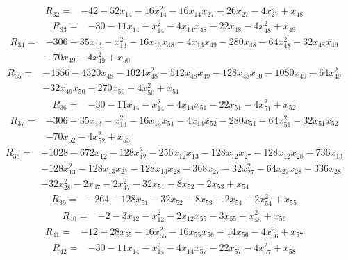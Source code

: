 \[\begin{aligned}R_{32}={}&-42-52x_{14}-16x_{14}^{2}-16x_{14}x_{27}-26x_{27}-4x_{27}^{2}+x_{48}
\end{aligned}\]
\[\begin{aligned}R_{33}={}&-30-11x_{14}-x_{14}^{2}-4x_{14}x_{48}-22x_{48}-4x_{48}^{2}+x_{49}
\end{aligned}\]
\[\begin{aligned}R_{34}={}&-306-35x_{13}-x_{13}^{2}-16x_{13}x_{48}-4x_{13}x_{49}-280x_{48}-64x_{48}^{2}-32x_{48}x_{49}
\\&-70x_{49}-4x_{49}^{2}+x_{50}
\end{aligned}\]
\[\begin{aligned}R_{35}={}&-4556-4320x_{48}-1024x_{48}^{2}-512x_{48}x_{49}-128x_{48}x_{50}-1080x_{49}-64x_{49}^{2}
\\&-32x_{49}x_{50}-270x_{50}-4x_{50}^{2}+x_{51}
\end{aligned}\]
\[\begin{aligned}R_{36}={}&-30-11x_{14}-x_{14}^{2}-4x_{14}x_{51}-22x_{51}-4x_{51}^{2}+x_{52}
\end{aligned}\]
\[\begin{aligned}R_{37}={}&-306-35x_{13}-x_{13}^{2}-16x_{13}x_{51}-4x_{13}x_{52}-280x_{51}-64x_{51}^{2}-32x_{51}x_{52}
\\&-70x_{52}-4x_{52}^{2}+x_{53}
\end{aligned}\]
\[\begin{aligned}R_{38}={}&-1028-672x_{12}-128x_{12}^{2}-256x_{12}x_{13}-128x_{12}x_{27}-128x_{12}x_{28}-736x_{13}
\\&-128x_{13}^{2}-128x_{13}x_{27}-128x_{13}x_{28}-368x_{27}-32x_{27}^{2}-64x_{27}x_{28}-336x_{28}
\\&-32x_{28}^{2}-2x_{47}-2x_{47}^{2}-32x_{51}-8x_{52}-2x_{53}+x_{54}
\end{aligned}\]
\[\begin{aligned}R_{39}={}&-264-128x_{51}-32x_{52}-8x_{53}-2x_{54}-2x_{54}^{2}+x_{55}
\end{aligned}\]
\[\begin{aligned}R_{40}={}&-2-3x_{12}-x_{12}^{2}-2x_{12}x_{55}-3x_{55}-x_{55}^{2}+x_{56}
\end{aligned}\]
\[\begin{aligned}R_{41}={}&-12-28x_{55}-16x_{55}^{2}-16x_{55}x_{56}-14x_{56}-4x_{56}^{2}+x_{57}
\end{aligned}\]
\[\begin{aligned}R_{42}={}&-30-11x_{14}-x_{14}^{2}-4x_{14}x_{57}-22x_{57}-4x_{57}^{2}+x_{58}
\end{aligned}\]
